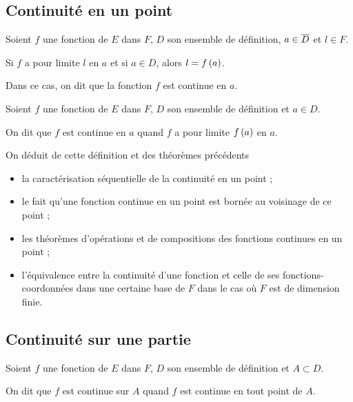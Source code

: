 \subsection{Continuité en un point}

\begin{prop}
Soient \(f\) une fonction de \(E\) dans \(F\), \(D\) son ensemble de définition, \(a\in\overline{D}\) et \(l\in F\).

Si \(f\) a pour limite \(l\) en \(a\) et si \(a\in D\), alors \(l=f\left(a\right)\).
\end{prop}

Dans ce cas, on dit que la fonction \(f\) est continue en \(a\).

\begin{defi}
Soient \(f\) une fonction de \(E\) dans \(F\), \(D\) son ensemble de définition et \(a\in D\).

On dit que \(f\) est continue en \(a\) quand \(f\) a pour limite \(f\left(a\right)\) en \(a\).
\end{defi}

On déduit de cette définition et des théorèmes précédents

\begin{itemize}
    \item la caractérisation séquentielle de la continuité en un point ; \\
    \item le fait qu'une fonction continue en un point est bornée au voisinage de ce point ; \\
    \item les théorèmes d'opérations et de compositions des fonctions continues en un point ; \\
    \item l'équivalence entre la continuité d'une fonction et celle de ses fonctions-coordonnées dans une certaine base de \(F\) dans le cas où \(F\) est de dimension finie.
\end{itemize}

\subsection{Continuité sur une partie}

\begin{defi}
Soient \(f\) une fonction de \(E\) dans \(F\), \(D\) son ensemble de définition et \(A\subset D\).

On dit que \(f\) est continue sur \(A\) quand \(f\) est continue en tout point de \(A\).
\end{defi}

